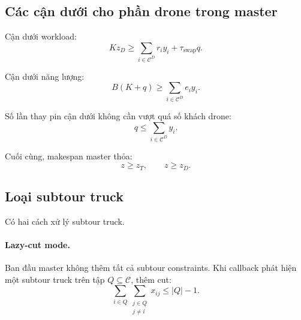 \documentclass[12pt,a4paper]{article}
\newcommand{\C}{\mathcal{C}}
\newcommand{\CD}{\mathcal{C}^{D}}
\begin{document}
\subsection{Các cận dưới cho phần drone trong master}


Cận dưới workload:
\begin{equation}
    Kz_D\ge \sum_{i\in \CD} r_i y_i + \tau_{\mathrm{swap}}q.
    \label{eq:drone-work-lb}
\end{equation}

Cận dưới năng lượng:
\begin{equation}
    B(K+q)\ge \sum_{i\in \CD} e_i y_i.
    \label{eq:energy-lb}
\end{equation}

Số lần thay pin cận dưới không cần vượt quá số khách drone:
\begin{equation}
    q\le \sum_{i\in \CD} y_i.
    \label{eq:q-upper}
\end{equation}


Cuối cùng, makespan master thỏa:
\begin{equation}
    z\ge z_T,\qquad z\ge z_D.
    \label{eq:z-link}
\end{equation}

\subsection{Loại subtour truck}

Có hai cách xử lý subtour truck.

\paragraph{Lazy-cut mode.}
Ban đầu master không thêm tất cả subtour constraints. Khi callback phát hiện một subtour truck trên tập $Q\subseteq \C$, thêm cut:
\begin{equation}
    \sum_{i\in Q}\sum_{\substack{j\in Q\\j\neq i}}x_{ij}\le |Q|-1.
    \label{eq:lazy-subtour}
\end{equation}
\end{document}
